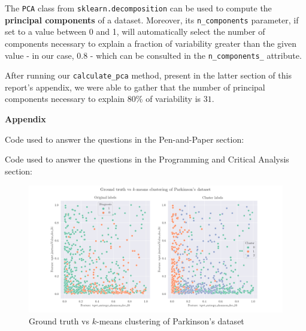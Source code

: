 \documentclass[12pt]{article}
\begin{document}
\begin{enumerate}[leftmargin=\labelsep,resume]
        The \texttt{PCA} class from \texttt{sklearn.decomposition} can be used to
        compute the \textbf{principal components} of a dataset. Moreover, its
        \texttt{n\_components} parameter, if set to a value between 0 and 1, will
        automatically select the number of components necessary to explain a fraction
        of variability greater than the given value - in our case, 0.8 - which can
        be consulted in the \texttt{n\_components\_} attribute.

        After running our \texttt{calculate\_pca} method, present in the latter
        section of this report's appendix, we were able to gather that the
        number of principal components necessary to explain 80\% of variability
        is $31$.

\end{enumerate}

\pagebreak

\large{\textbf{Appendix}\vskip 0.3cm}

Code used to answer the questions in the Pen-and-Paper section:



\pagebreak

Code used to answer the questions in the Programming and Critical Analysis section:



\pagebreak

\begin{figure}[H]
  \centering
  \includegraphics[width=\textwidth]{../assets/parkinsons.png}
  \caption{Ground truth vs $k$-means clustering of Parkinson's dataset}
  \label{fig:diagnoses-plots}
\end{figure}
\end{document}
